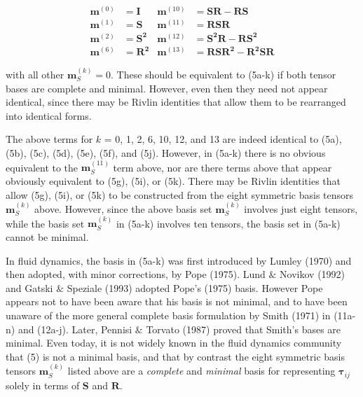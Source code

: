 %
\begin{align*}
	\mathbf{m}^{(0)} &= \mathbf{I}    &  \mathbf{m}^{(10)}  &= \mathbf{SR}-\mathbf{RS}  \\ 
	\mathbf{m}^{(1)} &= \mathbf{S}    &  \mathbf{m}^{(11)}  &= \mathbf{RSR} \\
	\mathbf{m}^{(2)} &= \mathbf{S^2}  &  \mathbf{m}^{(12)}  &= \mathbf{S^2R}-\mathbf{RS^2}  \\
	\mathbf{m}^{(6)} &= \mathbf{R^2}  &  \mathbf{m}^{(13)}  &= \mathbf{RSR^2}-\mathbf{R^2SR} 
\end{align*}
%
%   	 
	 	 

with all other $\mathbf{m}^{(k)}_S= 0$. These should be equivalent to (5a-k) if both tensor bases are complete and minimal.  However, even then they need not appear identical, since there may be Rivlin identities that allow them to be rearranged into identical forms.

The above terms for $k$ = 0, 1, 2, 6, 10, 12, and 13 are indeed identical to (5a), (5b), (5c), (5d), (5e), (5f), and (5j). However, in (5a-k) there is no obvious equivalent to the $\mathbf{m}^{(11)}_S$  term above, nor are there terms above that appear obviously equivalent to (5g), (5i), or (5k). There may be Rivlin identities that allow (5g), (5i), or (5k) to be constructed from the eight symmetric basis tensors  $\mathbf{m}^{(k)}_S$ above. However, since the above basis set $\mathbf{m}^{(k)}_S$ involves just eight tensors, while the basis set  $\mathbf{m}^{(k)}_S$  in (5a-k) involves ten tensors, the basis set in (5a-k) cannot be minimal.

In fluid dynamics, the basis in (5a-k) was first introduced by Lumley (1970) and then adopted, with minor corrections, by Pope (1975).  Lund $\&$ Novikov (1992) and Gatski $\&$ Speziale (1993) adopted Pope’s (1975) basis.  However Pope appears not to have been aware that his basis is not minimal, and to have been unaware of the more general complete basis formulation by Smith (1971) in (11a-n) and (12a-j).  Later, Pennisi $\&$ Torvato (1987) proved that Smith’s bases are minimal. Even today, it is not widely known in the fluid dynamics community that (5) is not a minimal basis, and that by contrast the eight symmetric basis tensors $\mathbf{m}^{(k)}_S$   listed above are a \textit{complete} and \textit{minimal} basis for representing  $\mathbf{\tau}_{ij}$ solely in terms of $\mathbf{S}$ and $\mathbf{R}$. 


